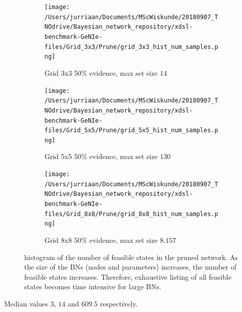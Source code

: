 \documentclass[a4paper, twoside, 11pt]{report}
\theoremstyle{plain}
\theoremstyle{definition}
\theoremstyle{remark}
\begin{document}
\begin{figure}[h!]
\centering
\captionsetup[subfigure]{justification=centering}

\begin{subfigure}{.3\linewidth}
\texttt{[image: /Users/jurriaan/Documents/MScWiskunde/20180907\_TNOdrive/Bayesian\_network\_repository/xdsl-benchmark-GeNIe-files/Grid\_3x3/Prune/grid\_3x3\_hist\_num\_samples.png]}
\caption{Grid 3x3 50\% evidence, max set size $14$}%
\label{grid_3x3}%
\end{subfigure}\hfill%
\begin{subfigure}{.3\linewidth}
\texttt{[image: /Users/jurriaan/Documents/MScWiskunde/20180907\_TNOdrive/Bayesian\_network\_repository/xdsl-benchmark-GeNIe-files/Grid\_5x5/Prune/grid\_5x5\_hist\_num\_samples.png]}
\caption{Grid 5x5 50\% evidence, max set size $130$}%
\label{grid_5x5}%
\end{subfigure}\hfill%
\begin{subfigure}{.3\linewidth}
\texttt{[image: /Users/jurriaan/Documents/MScWiskunde/20180907\_TNOdrive/Bayesian\_network\_repository/xdsl-benchmark-GeNIe-files/Grid\_8x8/Prune/grid\_8x8\_hist\_num\_samples.png]}
\caption{Grid 8x8 50\% evidence, max set size $8.157$}%
\label{grid_8x8}%
\end{subfigure}\hfill%

\vspace{0.75pc}
\caption{histogram of the number of feasible states in the pruned network. As the size of the BNs (nodes and parameters) increases, the number of feasible states increases. Therefore, exhaustive listing of all feasible states becomes time intensive for large BNs.}
\label{results5}
\end{figure}
Median values $3$, $14$ and $609.5$ respectively.
\end{document}
